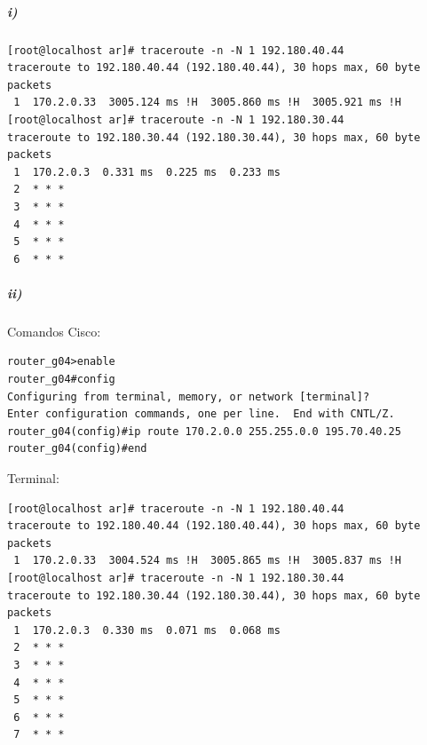 \subparagraph{i)}
\begin{verbatim}
[root@localhost ar]# traceroute -n -N 1 192.180.40.44                     
traceroute to 192.180.40.44 (192.180.40.44), 30 hops max, 60 byte packets 
 1  170.2.0.33  3005.124 ms !H  3005.860 ms !H  3005.921 ms !H            
[root@localhost ar]# traceroute -n -N 1 192.180.30.44                     
traceroute to 192.180.30.44 (192.180.30.44), 30 hops max, 60 byte packets 
 1  170.2.0.3  0.331 ms  0.225 ms  0.233 ms                               
 2  * * *                                                                 
 3  * * *                                                                 
 4  * * *                                                                 
 5  * * *                                                                 
 6  * * *                                                                 
\end{verbatim}
\subparagraph{ii)}
Comandos Cisco:
\begin{verbatim}                                                         
router_g04>enable                                                        
router_g04#config                                                        
Configuring from terminal, memory, or network [terminal]?                
Enter configuration commands, one per line.  End with CNTL/Z.            
router_g04(config)#ip route 170.2.0.0 255.255.0.0 195.70.40.25           
router_g04(config)#end                                                   
\end{verbatim}                                                                                                                                               
Terminal:
\begin{verbatim}                                                                         
[root@localhost ar]# traceroute -n -N 1 192.180.40.44                    
traceroute to 192.180.40.44 (192.180.40.44), 30 hops max, 60 byte packets
 1  170.2.0.33  3004.524 ms !H  3005.865 ms !H  3005.837 ms !H           
[root@localhost ar]# traceroute -n -N 1 192.180.30.44                    
traceroute to 192.180.30.44 (192.180.30.44), 30 hops max, 60 byte packets
 1  170.2.0.3  0.330 ms  0.071 ms  0.068 ms                                                             
 2  * * *                                                                
 3  * * *                                                                
 4  * * *                                                                
 5  * * *                                                                
 6  * * *                                                                
 7  * * *                                                                
\end{verbatim}
